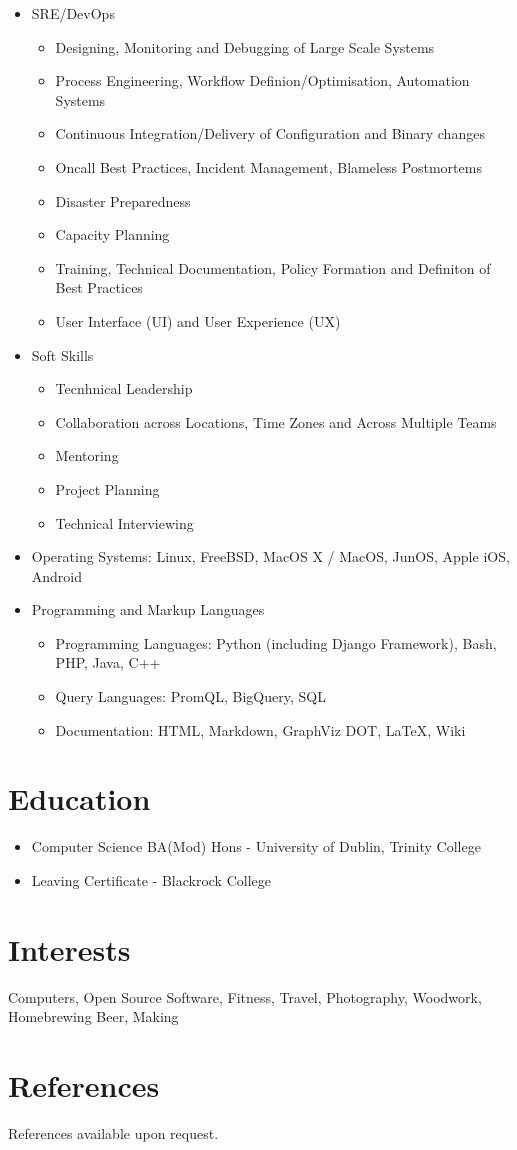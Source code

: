 \documentclass[a4paper, 10pt] {article}
\begin{document}
\begin{itemize}
\item SRE/DevOps
  \begin{itemize}
  \item Designing, Monitoring and Debugging of Large Scale Systems
  \item Process Engineering, Workflow Definion/Optimisation, Automation Systems
  \item Continuous Integration/Delivery of Configuration and Binary changes
  \item Oncall Best Practices, Incident Management, Blameless Postmortems
  \item Disaster Preparedness
  \item Capacity Planning
  \item Training, Technical Documentation, Policy Formation and Definiton of Best Practices
  \item User Interface (UI) and User Experience (UX)
  \end{itemize}
\item Soft Skills
  \begin{itemize}
  \item Tecnhnical Leadership
  \item Collaboration across Locations, Time Zones and Across Multiple Teams
  \item Mentoring
  \item Project Planning
  \item Technical Interviewing
  \end{itemize}
  \item Operating Systems: Linux, FreeBSD, MacOS X / MacOS, JunOS, Apple iOS, Android
\item Programming and Markup Languages
  \begin{itemize}
  \item Programming Languages: Python (including Django Framework), Bash, PHP, Java, C++
  \item Query Languages: PromQL, BigQuery, SQL
  \item Documentation: HTML, Markdown, GraphViz DOT, \LaTeX, Wiki
  \end{itemize}
\end{itemize}  

\section*{Education}

\begin{itemize}
  \item Computer Science BA(Mod) Hons - University of Dublin, Trinity College
  \item Leaving Certificate - Blackrock College
\end{itemize}

\section*{Interests}

Computers, Open Source Software, Fitness, Travel, Photography, Woodwork, Homebrewing Beer, Making

\section*{References}

References available upon request.
\end{document}
